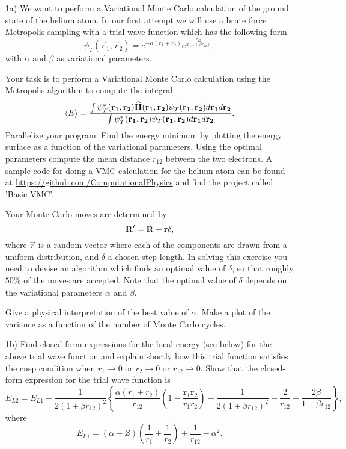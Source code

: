 \begin{enumerate}

\item[1a)]
We want to perform  a Variational Monte Carlo calculation of the ground state of the helium atom. In our first attempt we will use a brute force Metropolis sampling with a trial wave function which has the following form
\begin{equation}
   \psi_{T}( \vec r_1, \vec r_2) = 
   e^{-\alpha(r_1+r_2)}
   e^{\frac{r_{12}}{2(1+\beta r_{12})}}, 
\label{eq:trial}
\end{equation}
with $\alpha$ and $\beta$ as variational parameters.

Your task is to perform a Variational Monte Carlo calculation using the Metropolis algorithm to compute the integral
\begin{equation}
   \langle E \rangle =
   \frac{\int \psi^{\ast}_T({\bf r_1},{\bf r_2})\OP{H}({\bf r_1},{\bf r_2})\psi_T({\bf r_1},{\bf r_2}) d{\bf r_1}d{\bf r_2}}
        {\int\psi^{\ast}_T({\bf r_1},{\bf r_2})\psi_T({\bf r_1},{\bf r_2}) d{\bf r_1}d{\bf r_2}}.
\end{equation}
Parallelize your program. Find the energy minimum by plotting the energy surface as a function of the variational parameters. Using the optimal parameters compute the mean distance $r_{12}$ between the two electrons. A sample code for doing a VMC calculation for the helium atom can be found at \url{https://github.com/ComputationalPhysics} and find the project called 'Basic VMC'.

Your Monte Carlo moves are determined by
\begin{equation}
   {\bf R}' = {\bf R} + \vec r \delta ,
\end{equation}
where $\vec r$ is a random vector where each of the components are drawn from a uniform distribution, and $\delta$ a chosen step length. In solving this exercise you need to devise an algorithm which finds an optimal value of $\delta$, so that roughly $50\%$ of the moves are accepted. Note that the optimal value of $\delta$ depends on the variational parameters $\alpha$ and $\beta$. 

Give a physical  interpretation of the best value of $\alpha$. Make a plot of the variance as a function of the number of Monte Carlo cycles.

\item[1b)]
Find closed form expressions for the local energy (see below) for the above trial wave function and explain shortly how this trial function satisfies the cusp condition when $r_1\rightarrow 0$ or $r_2\rightarrow 0$ or  $r_{12}\rightarrow 0$. Show that the closed-form expression for the trial wave function is
\[ 
E_{L2} = E_{L1}+\frac{1}{2(1+\beta r_{12})^2}\left\{\frac{\alpha(r_1+r_2)}{r_{12}}(1-\frac{\mathbf{r}_1\mathbf{r}_2}{r_1r_2})-\frac{1}{2(1+\beta r_{12})^2}-\frac{2}{r_{12}}+\frac{2\beta}{1+\beta r_{12}}\right\},
\]
where
\[ 
E_{L1} = \left(\alpha-Z\right)\left(\frac{1}{r_1}+\frac{1}{r_2}\right)+\frac{1}{r_{12}}-\alpha^2.
\]


\end{enumerate}
